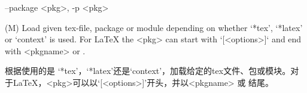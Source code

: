 \documentclass{article}
\newenvironment{options}{%
    \def\cstart{\begingroup\ttfamily\par\noindent\ignorespaces}%
    \def\csep{\endgroup\begingroup\list {}{}\item \relax}%
    \def\cend{\endlist\par\medskip\endgroup\cstart}%
    \cstart
}{%
    \endgroup
}
\begin{document}
\begin{options}
  --package \MacroArgs<pkg>, -p \MacroArgs<pkg>      \csep
(M) Load given tex-file, package or module depending on whether `*tex', `*latex'
or `context' is used. For LaTeX the \MacroArgs<pkg> can start with `[<options>]` and end
with \MacroArgs<pkgname> or .

根据使用的是 `*tex'，`*latex'还是`context'，加载给定的tex文件、包或模块。对于LaTeX，\MacroArgs<pkg>可以以`[<options>]'开头，并以\MacroArgs<pkgname> 或 结尾。
\cend
\end{options}

  

  
\end{document}

